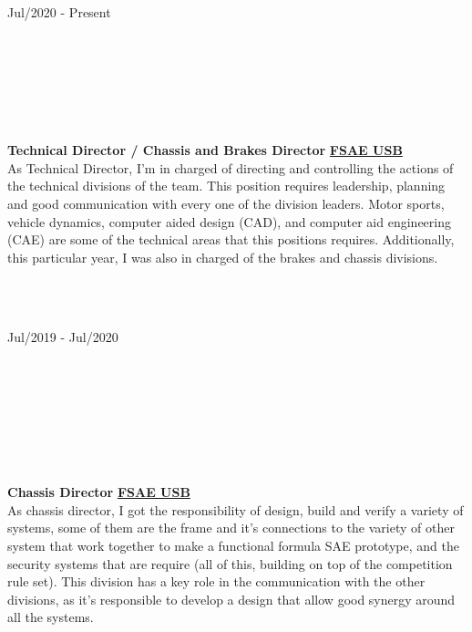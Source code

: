 \documentclass[10pt]{article}
\begin{document}
\begin{vwcol}[widths={0.235,0.765},
 sep=.8cm,rule=0pt,indent=0em,lines=7]
    \hspace{5pt}Jul/2020 - Present\par
    \hfill\\
    \hfill\\
    \hfill\\
    \hfill\\
    \hfill\\
    \hfill\\
    \textbf{Technical Director / Chassis and Brakes Director}
    \hfill
    \href{http://fsaeusb.com.ve/}{\color{blue!50!black}\textbf{FSAE USB}}\\
    \vspace{5pt}
    As Technical Director, I'm in charged of directing and controlling the actions of the technical divisions of the team. This position requires leadership, planning and good communication with every one of the division leaders. Motor sports, vehicle dynamics, computer aided design (CAD), and computer aid engineering (CAE) are some of the technical areas that this positions requires. Additionally, this particular year, I was also in charged of the  brakes and chassis divisions.\par
\end{vwcol}
\clearpage
\hfill\\
\hfill\\

\begin{vwcol}[widths={0.235,0.765},
 sep=.8cm, rule=0pt,indent=0em,lines=8]
    \hspace{5pt}Jul/2019 - Jul/2020\par
    \hfill\\
    \hfill\\
    \hfill\\
    \hfill\\
    \hfill\\
    \hfill\\
    \hfill\\
    \textbf{Chassis Director}
    \hfill
    \href{http://fsaeusb.com.ve/}{\color{blue!50!black}\textbf{FSAE USB}}\\
    \vspace{5pt}
    As chassis director, I got the responsibility of design, build and verify a variety of systems, some of them are the frame and it's connections to the variety of other system that work together to make a functional formula SAE prototype, and the security systems that are require (all of this, building on top of the competition rule set). This division has a key role in the communication with the other  divisions, as it's responsible to develop a design that allow good synergy around all the systems.\par
\end{vwcol}
\end{document}
